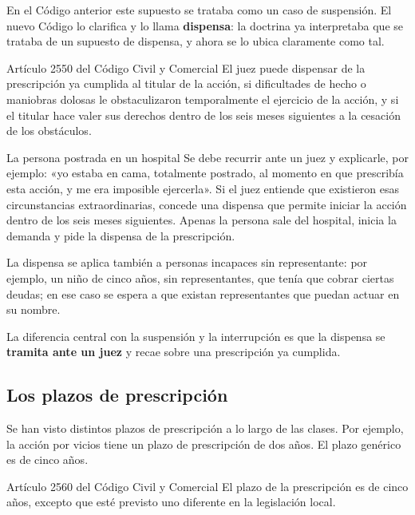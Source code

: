 \documentclass[12pt,oneside]{book}
\begin{document}
En el Código anterior este supuesto se trataba como un caso de suspensión. El nuevo Código lo clarifica y lo llama \textbf{dispensa}: la doctrina ya interpretaba que se trataba de un supuesto de dispensa, y ahora se lo ubica claramente como tal.

\begin{articulo}{Artículo 2550 del Código Civil y Comercial}
El juez puede dispensar de la prescripción ya cumplida al titular de la acción, si dificultades de hecho o maniobras dolosas le obstaculizaron temporalmente el ejercicio de la acción, y si el titular hace valer sus derechos dentro de los seis meses siguientes a la cesación de los obstáculos.
\end{articulo}

\begin{example}{La persona postrada en un hospital}
Se debe recurrir ante un juez y explicarle, por ejemplo: «yo estaba en cama, totalmente postrado, al momento en que prescribía esta acción, y me era imposible ejercerla». Si el juez entiende que existieron esas circunstancias extraordinarias, concede una dispensa que permite iniciar la acción dentro de los seis meses siguientes. Apenas la persona sale del hospital, inicia la demanda y pide la dispensa de la prescripción.
\end{example}

La dispensa se aplica también a personas incapaces sin representante: por ejemplo, un niño de cinco años, sin representantes, que tenía que cobrar ciertas deudas; en ese caso se espera a que existan representantes que puedan actuar en su nombre.

\begin{important}
La diferencia central con la suspensión y la interrupción es que la dispensa se \textbf{tramita ante un juez} y recae sobre una prescripción ya cumplida.
\end{important}

\subsection{Los plazos de prescripción}

Se han visto distintos plazos de prescripción a lo largo de las clases. Por ejemplo, la acción por vicios tiene un plazo de prescripción de dos años. El plazo genérico es de cinco años.

\begin{articulo}{Artículo 2560 del Código Civil y Comercial}
El plazo de la prescripción es de cinco años, excepto que esté previsto uno diferente en la legislación local.
\end{articulo}
\end{document}
